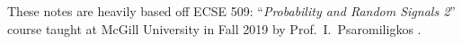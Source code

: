 These notes are heavily based off ECSE 509: ``\emph{Probability and Random Signals 2}'' course taught at McGill University in Fall 2019 by Prof.~I.~Psaromiligkos \cite{psaromiligkos_slides_2019}.